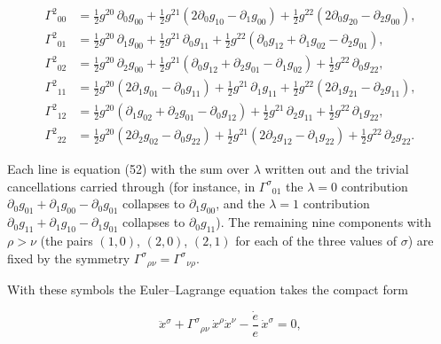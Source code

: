 \documentclass[
]{article}
\begin{document}
\[\begin{aligned}
\Gamma^{2}{}_{00} &= \tfrac{1}{2} g^{20}\, \partial_{0} g_{00} + \tfrac{1}{2} g^{21} \left( 2 \partial_{0} g_{10} - \partial_{1} g_{00} \right) + \tfrac{1}{2} g^{22} \left( 2 \partial_{0} g_{20} - \partial_{2} g_{00} \right), \\
\Gamma^{2}{}_{01} &= \tfrac{1}{2} g^{20}\, \partial_{1} g_{00} + \tfrac{1}{2} g^{21}\, \partial_{0} g_{11} + \tfrac{1}{2} g^{22} \left( \partial_{0} g_{12} + \partial_{1} g_{02} - \partial_{2} g_{01} \right), \\
\Gamma^{2}{}_{02} &= \tfrac{1}{2} g^{20}\, \partial_{2} g_{00} + \tfrac{1}{2} g^{21} \left( \partial_{0} g_{12} + \partial_{2} g_{01} - \partial_{1} g_{02} \right) + \tfrac{1}{2} g^{22}\, \partial_{0} g_{22}, \\
\Gamma^{2}{}_{11} &= \tfrac{1}{2} g^{20} \left( 2 \partial_{1} g_{01} - \partial_{0} g_{11} \right) + \tfrac{1}{2} g^{21}\, \partial_{1} g_{11} + \tfrac{1}{2} g^{22} \left( 2 \partial_{1} g_{21} - \partial_{2} g_{11} \right), \\
\Gamma^{2}{}_{12} &= \tfrac{1}{2} g^{20} \left( \partial_{1} g_{02} + \partial_{2} g_{01} - \partial_{0} g_{12} \right) + \tfrac{1}{2} g^{21}\, \partial_{2} g_{11} + \tfrac{1}{2} g^{22}\, \partial_{1} g_{22}, \\
\Gamma^{2}{}_{22} &= \tfrac{1}{2} g^{20} \left( 2 \partial_{2} g_{02} - \partial_{0} g_{22} \right) + \tfrac{1}{2} g^{21} \left( 2 \partial_{2} g_{12} - \partial_{1} g_{22} \right) + \tfrac{1}{2} g^{22}\, \partial_{2} g_{22}.
\end{aligned} \tag{55}\]

Each line is equation (52) with the sum over \(\lambda\) written out and
the trivial cancellations carried through (for instance, in
\(\Gamma^{\sigma}{}_{01}\) the \(\lambda = 0\) contribution
\(\partial_{0}g_{01} + \partial_{1}g_{00} - \partial_{0}g_{01}\)
collapses to \(\partial_{1}g_{00}\), and the \(\lambda = 1\)
contribution
\(\partial_{0}g_{11} + \partial_{1}g_{10} - \partial_{1}g_{01}\)
collapses to \(\partial_{0}g_{11}\)). The remaining nine components with
\(\rho > \nu\) (the pairs \((1,0)\), \((2,0)\), \((2,1)\) for each of
the three values of \(\sigma\)) are fixed by the symmetry
\(\Gamma^{\sigma}{}_{\rho\nu} = \Gamma^{\sigma}{}_{\nu\rho}\).

With these symbols the Euler--Lagrange equation takes the compact form

\[\ddot{x}^{\sigma} + \Gamma^{\sigma}{}_{\rho\nu}\, \dot{x}^{\rho} \dot{x}^{\nu} - \frac{\dot{e}}{e}\, \dot{x}^{\sigma} = 0, \tag{56}\]
\end{document}
